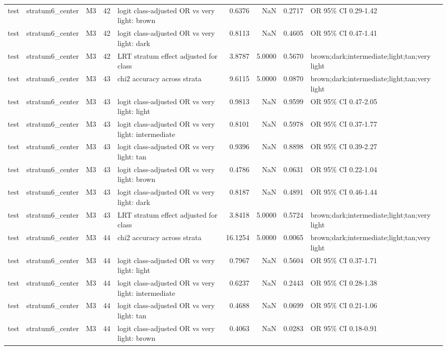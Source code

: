 \begin{tabular}{lllrlrrrl}
test & stratum6\_center & M3 & 42 & logit class-adjusted OR vs very light: brown & 0.6376 & NaN & 0.2717 & OR 95\% CI 0.29-1.42 \\
test & stratum6\_center & M3 & 42 & logit class-adjusted OR vs very light: dark & 0.8113 & NaN & 0.4605 & OR 95\% CI 0.47-1.41 \\
test & stratum6\_center & M3 & 42 & LRT stratum effect adjusted for class & 3.8787 & 5.0000 & 0.5670 & brown;dark;intermediate;light;tan;very light \\
test & stratum6\_center & M3 & 43 & chi2 accuracy across strata & 9.6115 & 5.0000 & 0.0870 & brown;dark;intermediate;light;tan;very light \\
test & stratum6\_center & M3 & 43 & logit class-adjusted OR vs very light: light & 0.9813 & NaN & 0.9599 & OR 95\% CI 0.47-2.05 \\
test & stratum6\_center & M3 & 43 & logit class-adjusted OR vs very light: intermediate & 0.8101 & NaN & 0.5978 & OR 95\% CI 0.37-1.77 \\
test & stratum6\_center & M3 & 43 & logit class-adjusted OR vs very light: tan & 0.9396 & NaN & 0.8898 & OR 95\% CI 0.39-2.27 \\
test & stratum6\_center & M3 & 43 & logit class-adjusted OR vs very light: brown & 0.4786 & NaN & 0.0631 & OR 95\% CI 0.22-1.04 \\
test & stratum6\_center & M3 & 43 & logit class-adjusted OR vs very light: dark & 0.8187 & NaN & 0.4891 & OR 95\% CI 0.46-1.44 \\
test & stratum6\_center & M3 & 43 & LRT stratum effect adjusted for class & 3.8418 & 5.0000 & 0.5724 & brown;dark;intermediate;light;tan;very light \\
test & stratum6\_center & M3 & 44 & chi2 accuracy across strata & 16.1254 & 5.0000 & 0.0065 & brown;dark;intermediate;light;tan;very light \\
test & stratum6\_center & M3 & 44 & logit class-adjusted OR vs very light: light & 0.7967 & NaN & 0.5604 & OR 95\% CI 0.37-1.71 \\
test & stratum6\_center & M3 & 44 & logit class-adjusted OR vs very light: intermediate & 0.6237 & NaN & 0.2443 & OR 95\% CI 0.28-1.38 \\
test & stratum6\_center & M3 & 44 & logit class-adjusted OR vs very light: tan & 0.4688 & NaN & 0.0699 & OR 95\% CI 0.21-1.06 \\
test & stratum6\_center & M3 & 44 & logit class-adjusted OR vs very light: brown & 0.4063 & NaN & 0.0283 & OR 95\% CI 0.18-0.91 \\

\end{tabular}
